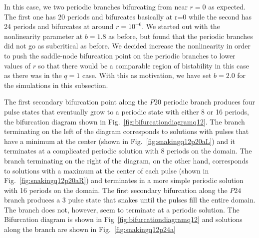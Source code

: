 \documentclass[../main/WavelengthCompetition.tex]{subfiles}
\begin{document}
In this case, we two periodic branches bifurcating from near $r=0$ as expected.  The first one has 20 periods and bifurcates basically at r=0 while the second has 24 periods and bifurcates at around $r=10^{-6}$.  We started out with the nonlinearity parameter at $b=1.8$ as before, but found that the periodic branches did not go as subcritical as before.  We decided increase the nonlinearity in order to push the saddle-node bifurcation point on the periodic branches to lower values of $r$ so that there would be a comparable region of bistability in this case as there was in the $q=1$ case.  With this as motivation, we have set $b=2.0$ for the simulations in this subsection.         

The first secondary bifurcation point along the $P20$ periodic branch produces  four pulse states that eventually grow to a periodic state with either 8 or 16 periods, the bifurcation diagram shown in Fig.~\ref{fig:bifurcationdiagramq12}. 
\FIGbifurcationdiagramD
The branch terminating on the left of the diagram corresponds to solutions with pulses that have a minimum at the center (shown in Fig.~\ref{fig:snakingq12p20aL}) and it terminates at a complicated periodic solution with 8 periods on the domain.
\FIGsnakingC
 The branch terminating on the right of the diagram, on the other hand, corresponds to solutions with a maximum at the center of each pulse (shown in Fig.~\ref{fig:snakingq12p20aR}) and terminates in a more simple periodic solution with 16 periods on the domain.
\FIGsnakingD
The first secondary bifurcation along the $P24$ branch produces a 3 pulse state that snakes until the pulses fill the entire domain.  The branch does not, however, seem to terminate at a periodic solution.  The Bifurcation diagram is shown in Fig~\ref{fig:bifurcationdiagramq12} and solutions along the branch are shown in Fig.~\ref{fig:snakingq12p24a}
\FIGsnakingE
\end{document}
